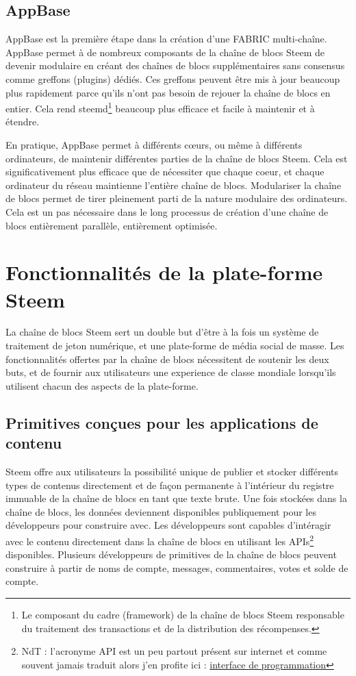 \documentclass[11pt]{article}
\begin{document}
\subsection{AppBase}
\label{sec:org0b8a16d}
AppBase est la première étape dans la création d'une FABRIC
multi-chaîne. AppBase permet à de nombreux composants de la chaîne
de blocs Steem de devenir modulaire en créant des chaînes de blocs
supplémentaires sans consensus comme greffons (plugins) dédiés. Ces
greffons peuvent être mis à jour beaucoup plus rapidement parce
qu'ils n'ont pas besoin de rejouer la chaîne de blocs en
entier. Cela rend steemd\footnote{Le composant du cadre (framework) de la chaîne de blocs Steem
responsable du traitement des transactions et de la distribution des
récompenses.} beaucoup plus efficace et facile à
maintenir et à étendre.

En pratique, AppBase permet à différents cœurs, ou même à
différents ordinateurs, de maintenir différentes parties de la
chaîne de blocs Steem. Cela est significativement plus efficace que
de nécessiter que chaque coeur, et chaque ordinateur du réseau
maintienne l'entière chaîne de blocs. Modulariser la chaîne de
blocs permet de tirer pleinement parti de la nature modulaire des
ordinateurs. Cela est un pas nécessaire dans le long processus de
création d'une chaîne de blocs entièrement parallèle, entièrement
optimisée. 
\section{Fonctionnalités de la plate-forme Steem}
\label{sec:org28b77d4}
La chaîne de blocs Steem sert un double but d'être à la fois un système de
traitement de jeton numérique, et une plate-forme de média social de
masse. Les fonctionnalités offertes par la chaîne de blocs
nécessitent de soutenir les deux buts, et de fournir aux
utilisateurs une experience de classe mondiale lorsqu'ils utilisent
chacun des aspects de la plate-forme.
\subsection{Primitives conçues pour les applications de contenu}
\label{sec:org7c77a4c}
Steem offre aux utilisateurs la possibilité unique de publier et
stocker différents types de contenus directement et de façon
permanente à l'intérieur du registre immuable de la chaîne de blocs
en tant que texte brute. Une fois stockées dans la chaîne de blocs,
les données deviennent disponibles publiquement pour les
développeurs pour construire avec. Les développeurs sont capables
d'intéragir avec le contenu directement dans la chaîne de blocs en
utilisant les APIs\footnote{NdT : l'acronyme API est un peu partout présent sur internet
et comme souvent jamais traduit alors j'en profite ici : \href{https://fr.wikipedia.org/wiki/Interface\_de\_programmation}{interface de programmation}} disponibles. Plusieurs développeurs de
primitives de la chaîne de blocs peuvent construire à partir de noms de
compte, messages, commentaires, votes et solde de compte.
\end{document}
